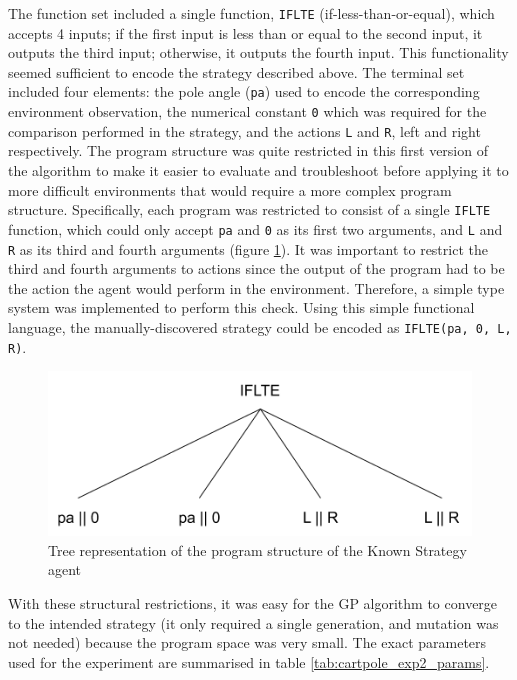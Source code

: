 The function set included a single function, \verb+IFLTE+ (if-less-than-or-equal), which accepts 4 inputs; if the first input is less than or equal to the second input, it outputs the third input; otherwise, it outputs the fourth input. This functionality seemed sufficient to encode the strategy described above. The terminal set included four elements: the pole angle (\verb+pa+) used to encode the corresponding environment observation, the numerical constant \verb+0+ which was required for the comparison performed in the strategy, and the actions \verb+L+ and \verb+R+, left and right respectively. The program structure was quite restricted in this first version of the algorithm to make it easier to evaluate and troubleshoot before applying it to more difficult environments that would require a more complex program structure. Specifically, each program was restricted to consist of a single \verb+IFLTE+ function, which could only accept \verb+pa+ and \verb+0+ as its first two arguments, and \verb+L+ and \verb+R+ as its third and fourth arguments (figure \ref{fig:iflte_tree}). It was important to restrict the third and fourth arguments to actions since the output of the program had to be the action the agent would perform in the environment. Therefore, a simple type system was implemented to perform this check. Using this simple functional language, the manually-discovered strategy could be encoded as \verb+IFLTE(pa, 0, L, R)+.

\begin{figure}[ht]
    \centering
    \includegraphics[width=12cm]{images/simple_iflte_program.png}
    \caption{Tree representation of the program structure of the Known Strategy agent}
    \label{fig:iflte_tree}
\end{figure}

With these structural restrictions, it was easy for the GP algorithm to converge to the intended strategy (it only required a single generation, and mutation was not needed) because the program space was very small. The exact parameters used for the experiment are summarised in table \ref{tab:cartpole_exp2_params}.

